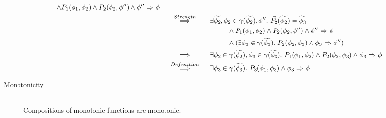\begin{proofatend}
\begin{description}
\begin{align*}
        \wedge P_1(\phi_1, \phi_2) \wedge P_2(\phi_2, \phi'')
        \wedge {\phi''} \,\,{\Rightarrow}\,\, {\phi} \\
        & \overset{Strength}{~\quad\quad\implies\quad\quad~} 
        \exists \widetilde{\phi_2}, \phi_2 \in \gamma(\widetilde{\phi_2}), \phi''.~ 
        \vec{P_2}(\widetilde{\phi_2}) = \widetilde{\phi_3}  \\
        & \quad\quad\quad\quad\quad\quad\quad\quad\quad\quad
        \wedge P_1(\phi_1, \phi_2) \wedge P_2(\phi_2, \phi'') 
        \wedge {\phi''} \,\,{\Rightarrow}\,\, {\phi}  \\
        & \quad\quad\quad\quad\quad\quad\quad\quad\quad\quad
        \wedge (\exists \phi_3 \in \gamma(\widetilde{\phi_3}).~ P_2(\phi_2, \phi_3) \wedge {\phi_3} \,\,{\Rightarrow}\,\, {\phi''}) \\
        & \overset{}{~\quad\quad\implies\quad\quad~} 
        \exists \phi_2 \in \gamma(\widetilde{\phi_2}), \phi_3 \in \gamma(\widetilde{\phi_3}).~ 
        P_1(\phi_1, \phi_2) \wedge P_2(\phi_2, \phi_3)
        \wedge {\phi_3} \,\,{\Rightarrow}\,\, {\phi} \\
        & \overset{Defenition}{~\quad\quad\implies\quad\quad~} 
        \exists \phi_3 \in \gamma(\widetilde{\phi_3}).~ 
        P_3(\phi_1, \phi_3)
        \wedge {\phi_3} \,\,{\Rightarrow}\,\, {\phi} 
        \end{align*}
        
        \item[Monotonicity]~\\
        Compositions of monotonic functions are monotonic.
    \end{description}
\end{proofatend}

